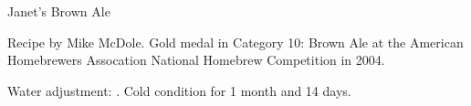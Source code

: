 \begin{recipe}{Janet's Brown Ale} %

\begin{aboutblock}
Recipe by Mike McDole. Gold medal in Category 10: Brown Ale at the American
Homebrewers Assocation National Homebrew Competition in 2004.
\sourceaha
\end{aboutblock}


\begin{methodandtiming}

\begin{mashsteps}
\end{mashsteps}

\begin{fermentationsteps}
\end{fermentationsteps}

\begin{directions}
Water adjustment: . Cold condition for 1 month
and 14 days.
\end{directions}

\end{methodandtiming}

\recipebreak

\begin{ingredientsblock}

\begin{malts}
\end{malts}

\begin{hops}
\end{hops}


\end{ingredientsblock}

\end{recipe}

